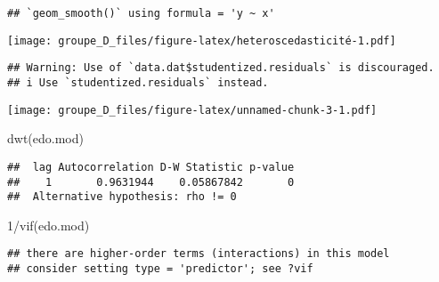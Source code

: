 \documentclass[
]{article}
\newenvironment{Shaded}{\begin{snugshade}}{\end{snugshade}}
\newcommand{\AttributeTok}[1]{\textcolor[rgb]{0.77,0.63,0.00}{#1}}
\newcommand{\CommentTok}[1]{\textcolor[rgb]{0.56,0.35,0.01}{\textit{#1}}}
\newcommand{\DecValTok}[1]{\textcolor[rgb]{0.00,0.00,0.81}{#1}}
\newcommand{\FunctionTok}[1]{\textcolor[rgb]{0.00,0.00,0.00}{#1}}
\newcommand{\NormalTok}[1]{#1}
\newcommand{\OtherTok}[1]{\textcolor[rgb]{0.56,0.35,0.01}{#1}}
\newcommand{\SpecialCharTok}[1]{\textcolor[rgb]{0.00,0.00,0.00}{#1}}
\newcommand{\StringTok}[1]{\textcolor[rgb]{0.31,0.60,0.02}{#1}}
\begin{document}
\begin{verbatim}
## `geom_smooth()` using formula = 'y ~ x'
\end{verbatim}

\texttt{[image: groupe\_D\_files/figure-latex/heteroscedasticité-1.pdf]}

\begin{Shaded}
\end{Shaded}

\begin{verbatim}
## Warning: Use of `data.dat$studentized.residuals` is discouraged.
## i Use `studentized.residuals` instead.
\end{verbatim}

\texttt{[image: groupe\_D\_files/figure-latex/unnamed-chunk-3-1.pdf]}

\begin{Shaded}
\begin{Highlighting}[]
\FunctionTok{dwt}\NormalTok{(edo.mod) }
\end{Highlighting}
\end{Shaded}

\begin{verbatim}
##  lag Autocorrelation D-W Statistic p-value
##    1       0.9631944    0.05867842       0
##  Alternative hypothesis: rho != 0
\end{verbatim}

\begin{Shaded}
\begin{Highlighting}[]
\DecValTok{1}\SpecialCharTok{/}\FunctionTok{vif}\NormalTok{(edo.mod)}
\end{Highlighting}
\end{Shaded}

\begin{verbatim}
## there are higher-order terms (interactions) in this model
## consider setting type = 'predictor'; see ?vif
\end{verbatim}
\end{document}
